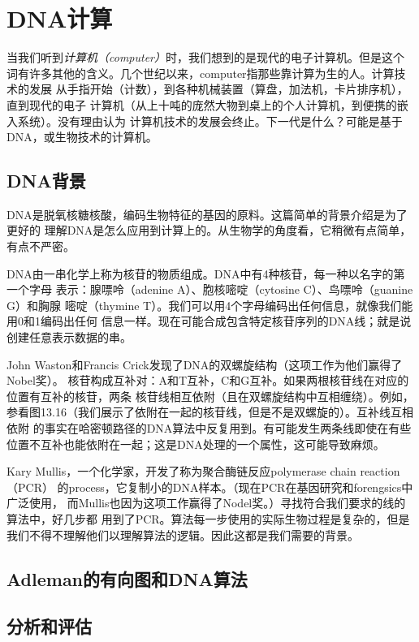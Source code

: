 \section{DNA计算}
当我们听到\emph{计算机（computer）}时，我们想到的是现代的电子计算机。但是这个
词有许多其他的含义。几个世纪以来，computer指那些靠计算为生的人。计算技术的发展
从手指开始（计数），到各种机械装置（算盘，加法机，卡片排序机），直到现代的电子
计算机（从上十吨的庞然大物到桌上的个人计算机，到便携的嵌入系统）。没有理由认为
计算机技术的发展会终止。下一代是什么？可能是基于DNA，或生物技术的计算机。

\subsection{DNA背景}
DNA是脱氧核糖核酸，编码生物特征的基因的原料。这篇简单的背景介绍是为了更好的
理解DNA是怎么应用到计算上的。从生物学的角度看，它稍微有点简单，有点不严密。

DNA由一串化学上称为核苷的物质组成。DNA中有4种核苷，每一种以名字的第一个字母
表示：腺嘌呤（adenine A）、胞核嘧啶（cytosine C）、鸟嘌呤（guanine G）和胸腺
嘧啶（thymine T）。我们可以用4个字母编码出任何信息，就像我们能用0和1编码出任何
信息一样。现在可能合成包含特定核苷序列的DNA线；就是说创建任意表示数据的串。

John Waston和Francis Crick发现了DNA的双螺旋结构（这项工作为他们赢得了Nobel奖）。
核苷构成互补对：A和T互补，C和G互补。如果两根核苷线在对应的位置有互补的核苷，两条
核苷线相互依附（且在双螺旋结构中互相缠绕）。例如，参看图13.16（我们展示了依附在一起的核苷线，但是不是双螺旋的）。互补线互相依附
的事实在哈密顿路径的DNA算法中反复用到。有可能发生两条线即使在有些位置不互补也能依附在一起；这是DNA处理的一个属性，这可能导致麻烦。

Kary Mullis，一个化学家，开发了称为聚合酶链反应polymerase chain reaction（PCR）
的process，它复制小的DNA样本。（现在PCR在基因研究和forengsics中广泛使用，
而Mullis也因为这项工作赢得了Nodel奖。）寻找符合我们要求的线的算法中，好几步都
用到了PCR。算法每一步使用的实际生物过程是复杂的，但是我们不得不理解他们以理解算法的逻辑。因此这都是我们需要的背景。


\subsection{Adleman的有向图和DNA算法}
\subsection{分析和评估}
